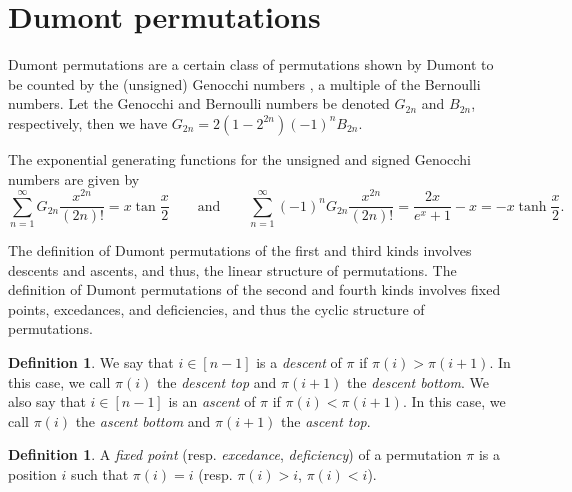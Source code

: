 \documentclass[
final
]{dmtcs-episciences}
\theoremstyle{definition}
\newtheorem{definition}[theorem]{Definition}
\theoremstyle{remark}
\begin{document}



\section {Dumont permutations}

Dumont permutations are a certain class of permutations shown by Dumont \cite{Dumont} to be counted by the (unsigned) Genocchi numbers \cite[\href{https://oeis.org/A110501}{A110501}]{OEIS}, a multiple of the Bernoulli numbers.  Let the Genocchi and Bernoulli numbers be denoted $G_{2n}$ and $B_{2n}$, respectively, then we have $G_{2n} = 2 (1 - 2^{2n})(-1)^n B_{2n}$.

The exponential generating functions for the unsigned and signed Genocchi numbers are given by
$$\sum_{n=1}^\infty G_{2n} \frac {x^{2n}}{(2n)!} = x \tan \frac {x}{2} \qquad \text{and} \qquad \sum_{n=1}^\infty (-1)^n G_{2n} \frac {x^{2n}}{(2n)!} = \frac {2x}{e^x + 1} - x = - x \tanh \frac {x}{2}.$$

%

The definition of Dumont permutations of the first and third kinds involves descents and ascents, and thus, the linear structure of permutations. The definition of Dumont permutations of the second and fourth kinds involves fixed points, excedances, and deficiencies, and thus the cyclic structure of permutations. 

\begin{definition}
We say that $i\in[n-1]$ is a \emph{descent} of $\pi$ if $\pi(i) > \pi(i+1)$.  
In this case, we call $\pi(i)$ the \emph{descent top} and $\pi(i+1)$ the \emph{descent bottom}. We also say that $i\in[n-1]$ is an \emph{ascent} of $\pi$ if $\pi(i) < \pi(i+1)$. In this case, we call $\pi(i)$ the \emph{ascent bottom} and $\pi(i+1)$ the \emph{ascent top}.
\end{definition}

\begin{definition}
A \emph{fixed point} (resp. \emph{excedance}, \emph{deficiency}) of a permutation $\pi$ is a position $i$ such that $\pi(i) =  i$ (resp. $\pi(i) > i$, $\pi(i) <  i$).
\end{definition}
\end{document}
